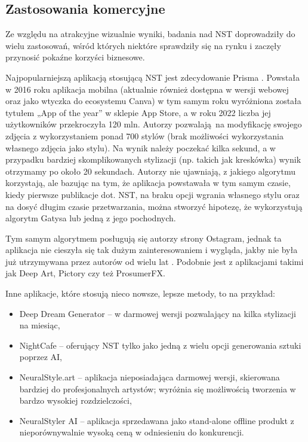 \documentclass[12pt]{article}
\begin{document}
\subsection{Zastosowania komercyjne}

\indent

Ze względu na atrakcyjne wizualnie wyniki, badania nad NST doprowadziły do wielu zastosowań, wśród których niektóre sprawdziły się na rynku i zaczęły przynosić pokaźne korzyści biznesowe.

Najpopularniejszą aplikacją stosującą NST jest zdecydowanie Prisma \cite{50}. Powstała w 2016 roku aplikacja mobilna (aktualnie również dostępna w wersji webowej oraz jako wtyczka do ecosystemu Canva) w tym samym roku wyróżniona została tytułem „App of the year” w sklepie App Store, a w roku 2022 liczba jej użytkowników przekroczyła 120 mln. Autorzy pozwalają na modyfikację swojego zdjęcia z wykorzystaniem ponad 700 stylów (brak możliwości wykorzystania własnego zdjęcia jako stylu). Na wynik należy poczekać kilka sekund, a w przypadku bardziej skomplikowanych stylizacji (np. takich jak kreskówka) wynik otrzymamy po około 20 sekundach. Autorzy nie ujawniają, z jakiego algorytmu korzystają, ale bazując na tym, że aplikacja powstawała w tym samym czasie, kiedy pierwsze publikacje dot. NST, na braku opcji wgrania własnego stylu oraz na dosyć długim czasie przetwarzania, można stworzyć hipotezę, że wykorzystują algorytm Gatysa lub jedną z jego pochodnych.

Tym samym algorytmem posługują się autorzy strony Ostagram, jednak ta aplikacja nie cieszyła się tak dużym zainteresowaniem i wygląda, jakby nie była już utrzymywana przez autorów od wielu lat \cite{51}. Podobnie jest z aplikacjami takimi jak Deep Art, Pictory czy też ProsumerFX.

Inne aplikacje, które stosują nieco nowsze, lepsze metody, to na przykład:
\begin{itemize}
    \item Deep Dream Generator – w darmowej wersji pozwalający na kilka stylizacji na miesiąc,
    \item NightCafe – oferujący NST tylko jako jedną z wielu opcji generowania sztuki poprzez AI,
    \item NeuralStyle.art – aplikacja nieposiadająca darmowej wersji, skierowana bardziej do profesjonalnych artystów; wyróżnia się możliwością tworzenia w bardzo wysokiej rozdzielczości,
    \item NeuralStyler AI – aplikacja sprzedawana jako stand-alone offline produkt z nieporównywalnie wysoką ceną w odniesieniu do konkurencji.
\end{itemize}
\indent
\end{document}

